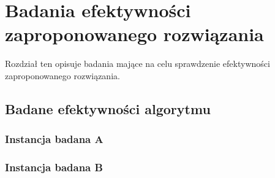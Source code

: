 \chapter{Badania efektywności zaproponowanego rozwiązania}
Rozdział ten opisuje badania mające na celu sprawdzenie efektywności
zaproponowanego rozwiązania.

\section{Badane efektywności algorytmu}
\subsection{Instancja badana A}
\subsection{Instancja badana B}
